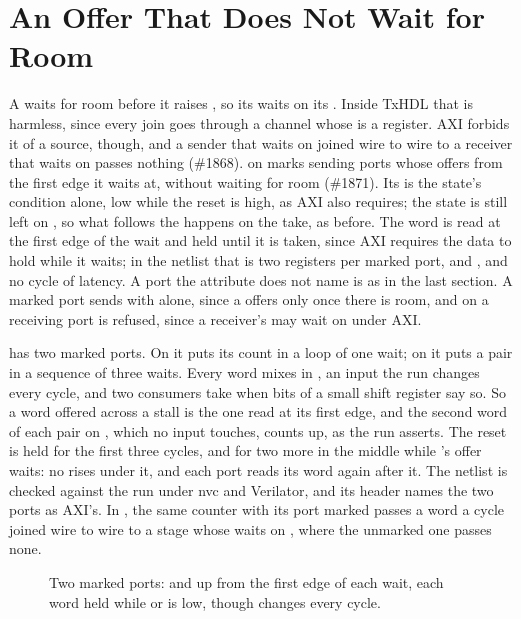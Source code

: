 \section{An Offer That Does Not Wait for Room}
\label{sec:x-put-axi}

A  waits for room before it raises , so its
 waits on its .
Inside TxHDL that is harmless, since every join goes through a channel
whose  is a register.
AXI forbids it of a source, though, and a sender that waits on
 joined wire to wire to a receiver that waits on
 passes nothing (\#1868).
\code{\#[axi(a, b)]} on  marks sending ports whose
 offers from the first edge it waits at, without waiting for
room (\#1871).
Its  is the state's condition alone, low while the reset
is high, as AXI also requires; the state is still left on
, so what follows the  happens on the take, as
before.
The word is read at the first edge of the wait and held until it is
taken, since AXI requires the data to hold while it waits; in the
netlist that is two registers per marked port, 
and , and no cycle of latency.
A port the attribute does not name is as in the last section.
A marked port sends with  alone, since a  offers
only once there is room, and \code{\#[axi]} on a receiving port is
refused, since a receiver's  may wait on 
under AXI.

 has two marked ports.
On  it puts its count in a loop of one wait; on  it
puts a pair in a sequence of three waits.
Every word mixes in , an input the run changes every cycle,
and two consumers take when bits of a small shift register say so.
So a word offered across a stall is the one read at its first edge,
and the second word of each pair on , which no input touches,
counts up, as the run asserts.
The reset is held for the first three cycles, and for two more in the
middle while 's offer waits: no  rises under it,
and each port reads its word again after it.
The netlist is checked against the run under nvc and Verilator, and
its header names the two ports as AXI's.
In , the same counter with its port marked passes
a word a cycle joined wire to wire to a stage whose  waits
on , where the unmarked one passes none.

\begin{figure}[htbp]
\centering

\caption{Two marked ports:  and  up from
the first edge of each wait, each word held while  or
 is low, though  changes every cycle.}
\label{fig:x-put-axi}
\end{figure}

